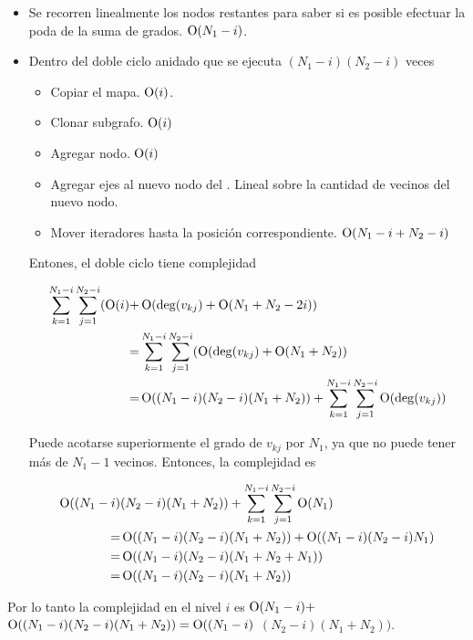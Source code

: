 \begin{itemize}
\item Se recorren linealmente los nodos restantes para saber si es posible
efectuar la poda de la suma de grados. $\operatorname{O}(N_1 - i)$.
\item Dentro del doble ciclo anidado que se ejecuta
$(N_1 - i)  (N_2 - i)$ veces
    \begin{itemize}
    \item Copiar el mapa. $\operatorname{O}(i)$.
    \item Clonar subgrafo. $\operatorname{O}(i)$
    \item Agregar nodo. $\operatorname{O}(i)$
    \item Agregar ejes al nuevo nodo del . Lineal sobre la cantidad de
    vecinos del nuevo nodo.
    \item Mover iteradores hasta la posición correspondiente.
    $\operatorname{O}(N_1 - i + N_2 - i)$
    \end{itemize}

    Entones, el doble ciclo tiene complejidad

    \begin{align*}
    \sum_{k = 1}^{N_1 - i} \sum_{j = 1}^{N_2 - i} (\operatorname{O}(i) + & \operatorname{O}(\deg(v_{kj}) +
     \operatorname{O}(N_1 + N_2 - 2i)) \\
    =& \sum_{k = 1}^{N_1 - i} \sum_{j = 1}^{N_2 - i} (\operatorname{O}(\deg(v_{kj}) +
     \operatorname{O}(N_1 + N_2)) \\
    =& \operatorname{O}((N_1 - i)  (N_2 - i)  (N_1 + N_2)) + \sum_{k = 1}^{N_1 - i}
     \sum_{j = 1}^{N_2 - i} \operatorname{O}(\deg(v_{kj}))
    \end{align*}

    Puede acotarse superiormente el grado de $v_{kj}$ por $N_1$, ya que no puede
    tener más de $N_1 - 1$ vecinos. Entonces, la complejidad es

    \begin{align*}
    \operatorname{O}((N_1 - i) & (N_2 - i)  (N_1 + N_2)) + \sum_{k = 1}^{N_1 - i}
    \sum_{j = 1}^{N_2 - i} \operatorname{O}(N_1) \\
    =& \operatorname{O}((N_1 - i)  (N_2 - i)  (N_1 + N_2)) + \operatorname{O}((N_1 - i)
    (N_2 - i)  N_1) \\
    =& \operatorname{O}((N_1 - i)  (N_2 - i)  (N_1 + N_2 + N_1)) \\
    =& \operatorname{O}((N_1 - i)  (N_2 - i)  (N_1 + N_2))
    \end{align*}

\end{itemize}

Por lo tanto la complejidad en el nivel $i$ es $\operatorname{O}(N_1 - i) +$
$\operatorname{O}((N_1 - i)  (N_2 - i)  (N_1 + N_2)) = \operatorname{O}((N_1 - i) $
$ (N_2 - i)  (N_1 + N_2))$.

